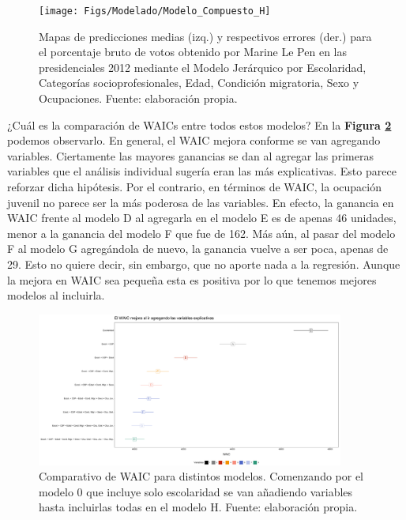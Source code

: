 \begin{figure}
	\centering
	\texttt{[image: Figs/Modelado/Modelo\_Compuesto\_H]}
	\caption{Mapas de predicciones medias (izq.) y respectivos errores (der.) para el porcentaje bruto de votos obtenido por Marine Le Pen en las presidenciales 2012 mediante el Modelo Jerárquico por Escolaridad, Categorías socioprofesionales, Edad, Condición migratoria, Sexo y Ocupaciones. Fuente: elaboración propia.}
	\label{fig:Modelo_Compuesto_H}
\end{figure}

¿Cuál es la comparación de WAICs entre todos estos modelos? En la \textbf{Figura \ref{fig:Compara_WAIC_Compuestos}} podemos observarlo. En general, el WAIC mejora conforme se van agregando variables. Ciertamente las mayores ganancias se dan al agregar las primeras variables que el análisis individual sugería eran las más explicativas. Esto parece reforzar dicha hipótesis. Por el contrario, en términos de WAIC, la ocupación juvenil no parece ser la más poderosa de las variables. En efecto, la ganancia en WAIC frente al modelo D al agregarla en el modelo E es de apenas 46 unidades, menor a la ganancia del modelo F que fue de 162. Más aún, al pasar del modelo F al modelo G agregándola de nuevo, la ganancia vuelve a ser poca, apenas de 29. Esto no quiere decir, sin embargo, que no aporte nada a la regresión. Aunque la mejora en WAIC sea pequeña esta es positiva por lo que tenemos mejores modelos al incluirla.\\

\begin{figure}
	\centering
	\includegraphics[width = 0.9\textwidth]{Figs/Modelado/Graf_WAIC_Modelos_Compuestos}
	\caption{Comparativo de WAIC para distintos modelos. Comenzando por el modelo 0 que incluye solo escolaridad se van añadiendo variables hasta incluirlas todas en el modelo H. Fuente: elaboración propia.}
	\label{fig:Compara_WAIC_Compuestos}
\end{figure}

